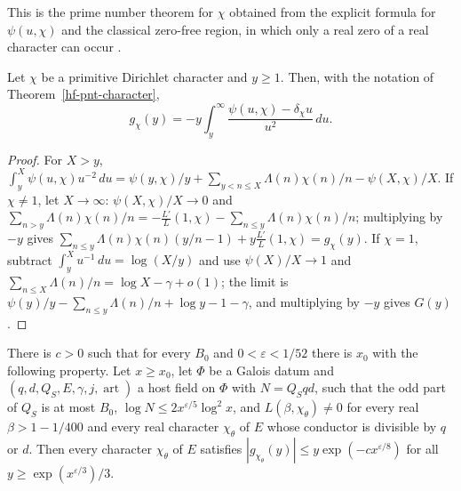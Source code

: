 This is the prime number theorem for $\chi$ obtained from the explicit formula for $\psi(u,\chi)$
and the classical zero-free region, in which only a real zero of a real character can occur
\cite[Chapters 14, 19 and 20]{Dav00}.

\begin{lemma}\label{hf-chebyshev-integral}
Let $\chi$ be a primitive Dirichlet character and $y\geq1$. Then, with the notation of
Theorem~\ref{hf-pnt-character},
\[
 g_\chi(y)=-y\int_y^\infty\frac{\psi(u,\chi)-\delta_\chi u}{u^2}\,du.
\]
\end{lemma}

\begin{proof}
For $X>y$, $\int_y^X\psi(u,\chi)u^{-2}\,du=\psi(y,\chi)/y+\sum_{y<n\leq X}\Lambda(n)\chi(n)/n-
\psi(X,\chi)/X$. If $\chi\neq1$, let $X\to\infty$: $\psi(X,\chi)/X\to0$ and
$\sum_{n>y}\Lambda(n)\chi(n)/n=-\frac{L'}{L}(1,\chi)-\sum_{n\leq y}\Lambda(n)\chi(n)/n$; multiplying
by $-y$ gives $\sum_{n\leq y}\Lambda(n)\chi(n)(y/n-1)+y\frac{L'}{L}(1,\chi)=g_\chi(y)$. If $\chi=1$,
subtract $\int_y^Xu^{-1}\,du=\log(X/y)$ and use $\psi(X)/X\to1$ and
$\sum_{n\leq X}\Lambda(n)/n=\log X-\gamma+o(1)$; the limit is
$\psi(y)/y-\sum_{n\leq y}\Lambda(n)/n+\log y-1-\gamma$, and multiplying by $-y$ gives $G(y)$.
\end{proof}

\begin{lemma}\label{hf-host-chebyshev}
There is $c>0$ such that for every $B_0$ and $0<\varepsilon<1/52$ there is $x_0$ with the
following property. Let $x\geq x_0$, let $\Phi$ be a Galois datum and $(q,d,Q_S,E,\gamma,j,\operatorname{art})$
a host field on $\Phi$ with $N=Q_Sqd$, such that the odd part of $Q_S$ is at most $B_0$,
$\log N\leq2x^{\varepsilon/5}\log^2x$, and $L(\beta,\chi_\theta)\neq0$ for every real
$\beta>1-1/400$ and every real character $\chi_\theta$ of $E$ whose conductor is divisible by $q$
or $d$. Then every character $\chi_\theta$ of $E$ satisfies
$|g_{\chi_\theta}(y)|\leq y\exp(-cx^{\varepsilon/8})$ for all $y\geq\exp(x^{\varepsilon/3})/3$.
\end{lemma}

